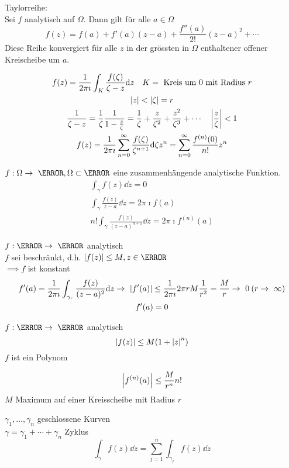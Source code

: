 Taylorreihe: \\
Sei $f$ analytisch auf $\Omega$. Dann gilt für alle $a \in \Omega$
\[ f(z) = f(a) + f'(a)(z-a) + \frac{f''(a)}{2!}(z-a)^2 + \dotsb \]
Diese Reihe konvergiert für alle $z$ in der grössten in $\Omega$ enthaltener offener Kreischeibe um $a$.
\begin{bew}[note = {Bewies für $a = 0$}]
	\begin{gather*}
		f(z) = \frac{1}{2\pi\imath} \int_K \frac{f(\zeta)}{\zeta - z} \dd z \quad K = \text{ Kreis um $0$ mit Radius } r \\
		\abs{z} < \abs{\zeta} = r \\
		\frac{1}{\zeta - z} = \frac{1}{\zeta} \frac{1}{1-\frac{z}{\zeta}} = \frac{1}{\zeta} + \frac{z}{\zeta^2} + \frac{z^2}{\zeta^3} + \dotsb \quad \abs{\frac{z}{\zeta}} < 1 \\
		f(z) = \frac{1}{2\pi\imath} \sum_{n=0}^\infty \frac{f(\zeta)}{\zeta^{n+1}} \dd \zeta z^n = \sum_{n=0}^\infty \frac{f^{(n)}(0)}{n!} z^n
	\end{gather*}
\end{bew}
$f: \Omega \rightarrow \C , \Omega \subset \C$ eine zusammenhängende analytische Funktion.
\begin{gather*}
	\int_\gamma f(z) \dd z = 0 \\
	\int_\gamma \frac{f(z)}{z-a} \dd z = 2\pi\imath f(a) \\
	n! \int_\gamma \frac{f(z)}{(z-a)^{n+1}} \dd z = 2\pi\imath f^{(n)}(a)
\end{gather*}
\begin{satz*}[note = Satz von Liouville , index = Satz von Liouville , indexformat = {3!12~ 1!~23}]
	$f: \C \rightarrow \C$ analytisch \\
	$f$ sei beschränkt, d.h. $\abs{f(z)} \leq M , z \in \C$ \\
	$\implies f$ ist konstant
	\begin{gather*}
		f'(a) = \frac{1}{2\pi\imath} \int_{\gamma_r} \frac{f(z)}{(z-a)^2} \dd z \rightarrow \abs{f'(a)} \leq \frac{1}{2\pi\imath} 2\pi r M \frac{1}{r^2} = \frac{M}{r} \rightarrow 0 \: ( r \rightarrow \infty ) \\
		f'(a) = 0
	\end{gather*}
\end{satz*}
$f: \C \rightarrow \C$ analytisch
\[ \abs{f(z)} \leq M ( 1 + \abs{z}^n ) \]
$f$ ist ein Polynom

\[ \abs{f^{(n)}(a)} \leq \frac{M}{r^n} n! \]
$M$ Maximum auf einer Kreisscheibe mit Radius $r$

$\gamma_1 , \dotsc , \gamma_n$ geschlossene Kurven \\
$\gamma = \gamma_1 + \dotsb + \gamma_n$ Zyklus \\
\[ \int_\gamma f(z) \dd z = \sum_{j=1}^n \int_{\gamma_j} f(z) \dd z \]

